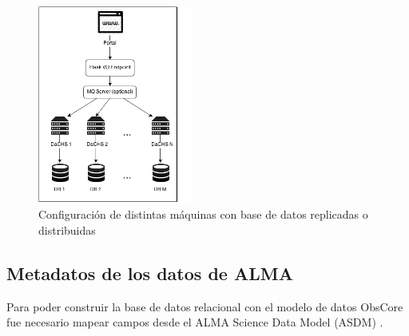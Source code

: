 \begin{figure}[ht]
    \centering
    \includegraphics[width=0.45\textwidth]{images/interaccion.png}
    \caption{Configuración de distintas máquinas con base de datos replicadas o distribuidas}
    \label{fig:dachs}
\end{figure}

\subsection{Metadatos de los datos de ALMA}

Para poder construir la base de datos relacional con el modelo de datos ObsCore fue
necesario mapear campos desde el ALMA Science Data Model (ASDM) \cite{viallefond2009sdm}.

